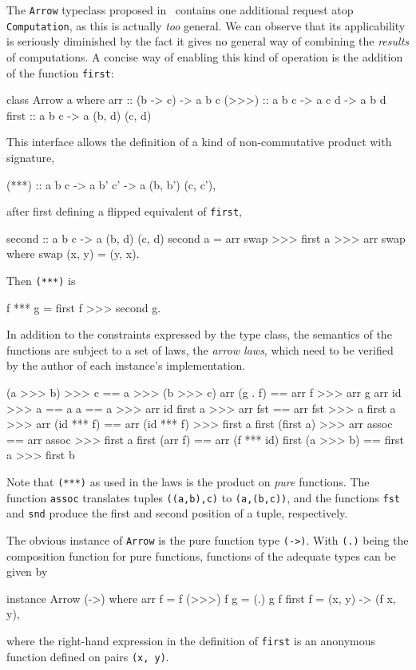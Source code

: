 The \verb|Arrow| typeclass proposed in~\cite{hughes-monad2arr} contains one
additional request atop \linebreak\verb|Computation|, as this is actually
\emph{too} general. We can observe that its applicability is seriously
diminished by the fact it gives no general way of combining the \emph{results}
of computations. A concise way of enabling this kind of operation is the
addition of the function \verb|first|:

\begin{code}
  class Arrow a where
      arr   :: (b -> c) -> a b c
      (>>>) :: a b c -> a c d -> a b d
      first :: a b c -> a (b, d) (c, d)
\end{code}

This interface allows the definition of a kind of non-commutative product with
signature,
\begin{code}
  (***) :: a b c -> a b' c' -> a (b, b') (c, c')\textrm{,}
\end{code}
after first defining a flipped equivalent of \verb|first|,
\begin{code}
  second :: a b c -> a (b, d) (c, d)
  second a = arr swap >>> first a >>> arr swap
    where swap (x, y) = (y, x)\textrm{.}
\end{code}
Then \verb|(***)| is
\begin{code}
  f *** g = first f >>> second g\textrm{.}
\end{code}

In addition to the constraints expressed by the type class, the semantics of the
functions are subject to a set of laws, the \emph{arrow laws}, which need to be
verified by the author of each instance's implementation.

\begin{code}[numbers=left]
                (a >>> b) >>> c == a >>> (b >>> c)
                    arr (g . f) == arr f >>> arr g
                   arr id >>> a == a
                              a == a >>> arr id
            first a >>> arr fst == arr fst >>> a
     first a >>> arr (id *** f) == arr (id *** f) >>> first a
  first (first a) >>> arr assoc == arr assoc >>> first a
                  first (arr f) == arr (f *** id)
                first (a >>> b) == first a >>> first b
\end{code}

Note that \verb|(***)| as used in the laws is the product on \emph{pure}
functions. The function \verb|assoc| translates tuples \verb|((a,b),c)| to
\verb|(a,(b,c))|, and the functions \verb|fst| and \verb|snd| produce the first
and second position of a tuple, respectively.

The obvious instance of \verb|Arrow| is the pure function type \verb|(->)|. With
\verb|(.)| being the composition function for pure functions, functions of the
adequate types can be given by
\begin{code}
  instance Arrow (->) where
      arr f     = f
      (>>>) f g = (.) g f
      first f   = (x, y) -> (f x, y)\textrm{,}
\end{code}
where the right-hand expression in the definition of \verb|first| is an
anonymous function defined on pairs \verb|(x, y)|.
